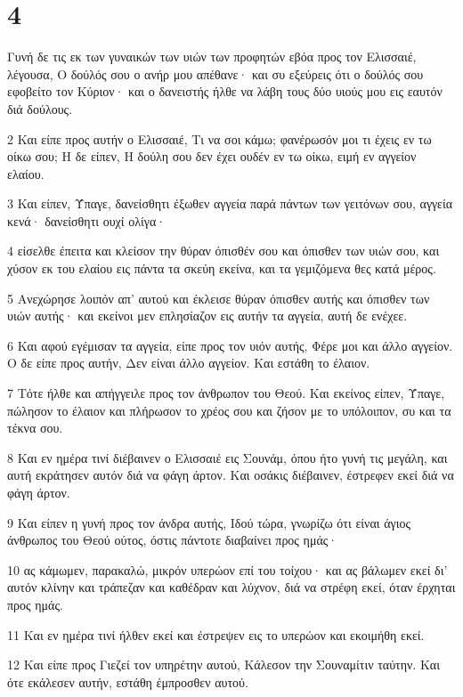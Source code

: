 \chapter{4}

\par Γυνή δε τις εκ των γυναικών των υιών των προφητών εβόα προς τον Ελισσαιέ, λέγουσα, Ο δούλός σου ο ανήρ μου απέθανε· και συ εξεύρεις ότι ο δούλός σου εφοβείτο τον Κύριον· και ο δανειστής ήλθε να λάβη τους δύο υιούς μου εις εαυτόν διά δούλους.
\par 2 Και είπε προς αυτήν ο Ελισσαιέ, Τι να σοι κάμω; φανέρωσόν μοι τι έχεις εν τω οίκω σου; Η δε είπεν, Η δούλη σου δεν έχει ουδέν εν τω οίκω, ειμή εν αγγείον ελαίου.
\par 3 Και είπεν, Ύπαγε, δανείσθητι έξωθεν αγγεία παρά πάντων των γειτόνων σου, αγγεία κενά· δανείσθητι ουχί ολίγα·
\par 4 είσελθε έπειτα και κλείσον την θύραν όπισθέν σου και όπισθεν των υιών σου, και χύσον εκ του ελαίου εις πάντα τα σκεύη εκείνα, και τα γεμιζόμενα θες κατά μέρος.
\par 5 Ανεχώρησε λοιπόν απ' αυτού και έκλεισε θύραν όπισθεν αυτής και όπισθεν των υιών αυτής· και εκείνοι μεν επλησίαζον εις αυτήν τα αγγεία, αυτή δε ενέχεε.
\par 6 Και αφού εγέμισαν τα αγγεία, είπε προς τον υιόν αυτής, Φέρε μοι και άλλο αγγείον. Ο δε είπε προς αυτήν, Δεν είναι άλλο αγγείον. Και εστάθη το έλαιον.
\par 7 Τότε ήλθε και απήγγειλε προς τον άνθρωπον του Θεού. Και εκείνος είπεν, Ύπαγε, πώλησον το έλαιον και πλήρωσον το χρέος σου και ζήσον με το υπόλοιπον, συ και τα τέκνα σου.
\par 8 Και εν ημέρα τινί διέβαινεν ο Ελισσαιέ εις Σουνάμ, όπου ήτο γυνή τις μεγάλη, και αυτή εκράτησεν αυτόν διά να φάγη άρτον. Και οσάκις διέβαινεν, έστρεφεν εκεί διά να φάγη άρτον.
\par 9 Και είπεν η γυνή προς τον άνδρα αυτής, Ιδού τώρα, γνωρίζω ότι είναι άγιος άνθρωπος του Θεού ούτος, όστις πάντοτε διαβαίνει προς ημάς·
\par 10 ας κάμωμεν, παρακαλώ, μικρόν υπερώον επί του τοίχου· και ας βάλωμεν εκεί δι' αυτόν κλίνην και τράπεζαν και καθέδραν και λύχνον, διά να στρέφη εκεί, όταν έρχηται προς ημάς.
\par 11 Και εν ημέρα τινί ήλθεν εκεί και έστρεψεν εις το υπερώον και εκοιμήθη εκεί.
\par 12 Και είπε προς Γιεζεί τον υπηρέτην αυτού, Κάλεσον την Σουναμίτιν ταύτην. Και ότε εκάλεσεν αυτήν, εστάθη έμπροσθεν αυτού.
